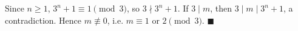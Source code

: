 Since $n\ge1$, $3^n+1\equiv1\pmod3$, so $3\nmid3^n+1$. If $3\mid m$, then $3\mid m\mid3^n+1$, a contradiction. Hence $m\not\equiv0$, i.e. $m\equiv1$ or $2\pmod3$. $\blacksquare$
